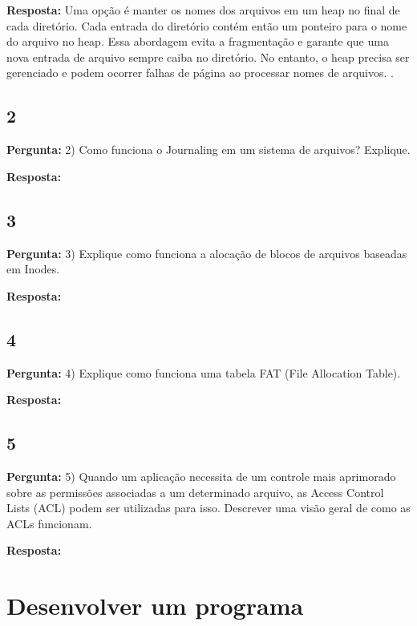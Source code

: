 \documentclass{article}
\begin{document}
\textbf{Resposta:} Uma opção é manter os nomes dos arquivos em um heap no final de cada diretório. Cada entrada do diretório contém então um ponteiro para o nome do arquivo no heap. Essa abordagem evita a fragmentação e garante que uma nova entrada de arquivo sempre caiba no diretório. No entanto, o heap precisa ser gerenciado e podem ocorrer falhas de página ao processar nomes de arquivos. \textcite[p. 199]{tanenbaum2021}. 

\subsection{2}

\textbf{Pergunta:} 2) Como funciona o Journaling em um sistema de arquivos? Explique.\newline

\textbf{Resposta:}  

\subsection{3}

\textbf{Pergunta:} 3) Explique como funciona a alocação de blocos de arquivos baseadas em Inodes.  \newline

\textbf{Resposta: }

\subsection{4}

\textbf{Pergunta:} 4) Explique como funciona uma tabela FAT (File Allocation Table). \newline

\textbf{Resposta:} 

\subsection{5}

\textbf{Pergunta:} 5) Quando um aplicação necessita de um controle mais aprimorado sobre as permissões associadas a um determinado arquivo, as Access Control Lists (ACL) podem ser utilizadas para isso. Descrever uma visão geral de como as ACLs funcionam.\newline

\textbf{Resposta:} 

\section{Desenvolver um programa}
\end{document}
